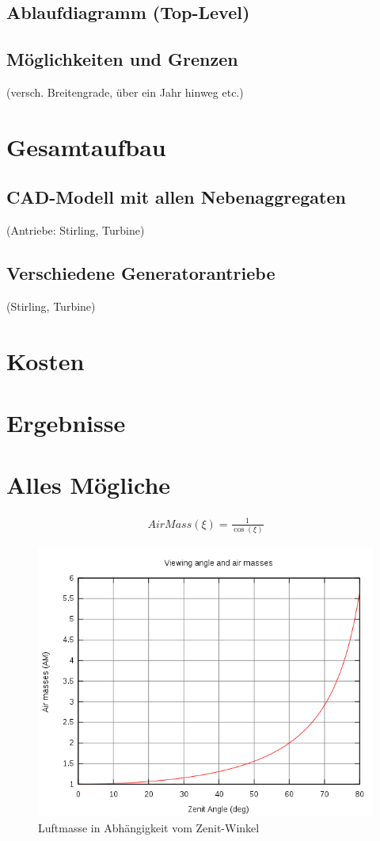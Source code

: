\documentclass[fontsize=10pt,paper=a4,bibliography=totoc]{scrartcl}
\newcommand{\maxim}[1]{{ \color{blue} #1}}
\begin{document}
\subsection{Ablaufdiagramm (Top-Level)}
\maxim{

}
\subsection{Möglichkeiten und Grenzen}
 (versch. Breitengrade, über ein Jahr hinweg etc.)
\section{Gesamtaufbau}
\subsection{CAD-Modell mit allen Nebenaggregaten}
 (Antriebe: Stirling, Turbine)
\subsection{Verschiedene Generatorantriebe}
 (Stirling, Turbine)
\section{Kosten}
\section{Ergebnisse}


\section{Alles Mögliche}

\begin{align*}
	AirMass(\xi)=\frac{1}{\cos(\xi)}
\end{align*}

\begin{figure}
	\centering
	\includegraphics{images/Airmass.png}
	\caption{Luftmasse in Abhängigkeit vom Zenit-Winkel}
	\label{pic:AirMass}
\end{figure}
\end{document}
